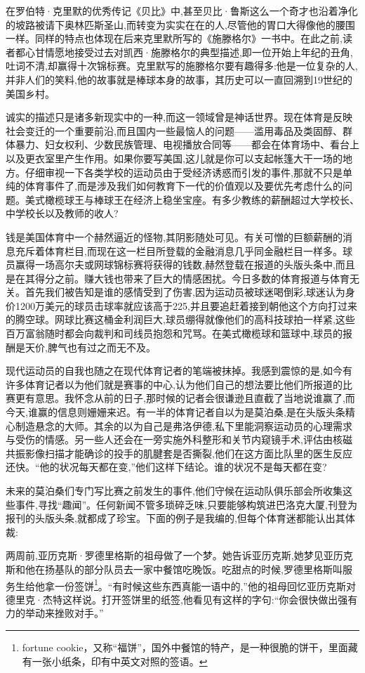 在罗伯特·克里默的优秀传记《贝比》中,甚至贝比·鲁斯这么一个奇才也沿着净化的坡路被请下奥林匹斯圣山,而转变为实实在在的人,尽管他的胃口大得像他的腰围一样。同样的特点也体现在后来克里默所写的《施滕格尔》一书中。在此之前,读者都心甘情愿地接受过去对凯西·施滕格尔的典型描述,即一位开始上年纪的丑角,吐词不清,却赢得十次锦标赛。克里默写的施滕格尔要有趣得多:他是一位复杂的人,并非人们的笑料,他的故事就是棒球本身的故事，其历史可以一直回溯到19世纪的美国乡村。

诚实的描述只是诸多新现实中的一种,而这一领域曾是神话世界。现在体育是反映社会变迁的一个重要前沿,而且国内一些最恼人的问题——滥用毒品及类固醇、群体暴力、妇女权利、少数民族管理、电视播放合同等——都会在体育场中、看台上以及更衣室里产生作用。如果你要写美国,这儿就是你可以支起帐篷大干一场的地方。仔细审视一下各类学校的运动员由于受经济诱惑而引发的事件,那就不只是单纯的体育事件了,而是涉及我们如何教育下一代的价值观以及要优先考虑什么的问题。美式橄榄球王与棒球王在经济上稳坐宝座。有多少教练的薪酬超过大学校长、中学校长以及教师的收人?

钱是美国体育中一个赫然逼近的怪物,其阴影随处可见。有关可憎的巨额薪酬的消息充斥着体育栏目,而现在这一栏目所登载的金融消息几乎同金融栏目一样多。球员赢得一场高尔夫或网球锦标赛将获得的钱数,赫然登载在报道的头版头条中,而且是在其得分之前。赚大钱也带来了巨大的情感困扰。今日多数的体育报道与体育无关。首先我们被告知是谁的感情受到了伤害,因为运动员被球迷喝倒彩,球迷认为身价1200万美元的球员击球率就应该高于225,并且要追赶着接到朝他这个方向打过来的腾空球。网球比赛这桶金利润巨大,球员绷得就像他们的高科技球拍一样紧,这些百万富翁随时都会向裁判和司线员抱怨和咒骂。在美式橄榄球和篮球中,球员的报酬是天价,脾气也有过之而无不及。

现代运动员的自我也随之在现代体育记者的笔端被抹掉。我感到震惊的是,如今有许多体育记者以为他们就是赛事的中心,认为他们自己的想法要比他们所报道的比赛更有意思。我怀念从前的日子,那时候的记者会很谦逊且直截了当地说谁赢了,而今天,谁赢的信息则姗姗来迟。有一半的体育记者自以为是莫泊桑,是在头版头条精心制造悬念的大师。其余的以为自己是弗洛伊德,私下里能洞察运动员的心理需求与受伤的情感。另一些人还会在一旁实施外科整形和关节内窥镜手术,评估由核磁共振影像扫描才能确诊的投手的肌腱套是否撕裂,他们在这方面比队里的医生反应还快。“他的状况每天都在变,”他们这样下结论。谁的状况不是每天都在变?

未来的莫泊桑们专门写比赛之前发生的事件,他们守候在运动队俱乐部会所收集这些事件,寻找“趣闻”。任何新闻不管多琐碎乏味,只要能够构筑进巴洛克大厦,刊登为报刊的头版头条,就都成了珍宝。下面的例子是我编的,但每个体育迷都能认出其体裁:

两周前,亚历克斯·罗德里格斯的祖母做了一个梦。她告诉亚历克斯,她梦见亚历克斯和他在扬基队的部分队员去一家中餐馆吃晚饭。吃甜点的时候,罗德里格斯叫服务生给他拿一份签饼\footnote{fortune cookie，又称“福饼”，国外中餐馆的特产，是一种很脆的饼干，里面藏有一张小纸条，印有中英文对照的签语。}。“有时候这些东西真能一语中的,”他的祖母回忆亚历克斯对德里克·杰特这样说。打开签饼里的纸签,他看见有这样的字句:“你会很快做出强有力的举动来挫败对手。”

